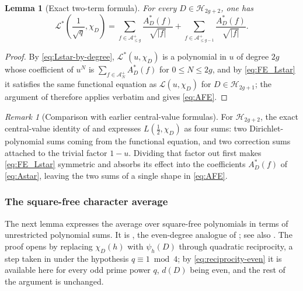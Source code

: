 \documentclass[a4paper,reqno]{amsart}
\numberwithin{equation}{section}
\newtheorem{lemma}[theorem]{Lemma}
\theoremstyle{remark}
\newtheorem{remark}[theorem]{Remark}
\theoremstyle{definition}
\newcommand{\A}{\mathcal{A}}
\begin{document}
\begin{lemma}[Exact two-term formula]\label{lem:AFE}
For every $D\in\mathcal H_{2g+2}$, one has
\begin{equation}\label{eq:AFE}
\mathcal L^*\!\left(\frac{1}{\sqrt q},\chi_D\right)
=
\sum_{f\in\A^+_{\le g}}
\frac{A_D^*(f)}{\sqrt{|f|}}
+
\sum_{f\in\A^+_{\le g-1}}
\frac{A_D^*(f)}{\sqrt{|f|}}.
\end{equation}
\end{lemma}

\begin{proof}
By \eqref{eq:Lstar-by-degree}, $\mathcal L^*(u,\chi_D)$ is a polynomial in
$u$ of degree $2g$ whose coefficient of $u^N$ is
$\sum_{f\in\A_N^+}A_D^*(f)$ for $0\le N\le2g$, and by \eqref{eq:FE_Lstar}
it satisfies the same functional equation as $\mathcal L(u,\chi_D)$ for
$D\in\mathcal H_{2g+1}$; the argument of \cite[Lemma~3.3]{AK12} therefore
applies verbatim and gives \eqref{eq:AFE}.
\end{proof}

\begin{remark}[Comparison with earlier central-value formulas]
\label{rem:four-sums}
For $\mathcal H_{2g+2}$, the exact central-value identity of
\cite[Lemma~2.1]{Ju20} and \cite[Lemma~2.4]{AM-21} expresses
$L(\tfrac12,\chi_D)$ as four sums: two Dirichlet-polynomial sums
coming from the functional equation, and two correction sums attached to the
trivial factor $1-u$. Dividing that factor out first makes
\eqref{eq:FE_Lstar} symmetric and absorbs its effect into the coefficients
$A_D^*(f)$ of \eqref{eq:Astar}, leaving the two sums of a single shape in
\eqref{eq:AFE}.
\end{remark}

\subsubsection*{The square-free character average}

The next lemma expresses the average over square-free polynomials in terms
of unrestricted polynomial sums. It is \cite[Lemma~2.2]{Ju20}, the even-degree
analogue of \cite[Lemma~2.2]{Fl17-1}; see also \cite{AM-21}. The proof opens
by replacing $\chi_D(h)$ with $\psi_h(D)$ through quadratic reciprocity, a
step taken in \cite{Fl17-1} under the hypothesis $q\equiv1\bmod4$; by
\eqref{eq:reciprocity-even} it is available here for every odd prime power
$q$, $d(D)$ being even, and the rest of the argument is unchanged.
\end{document}
